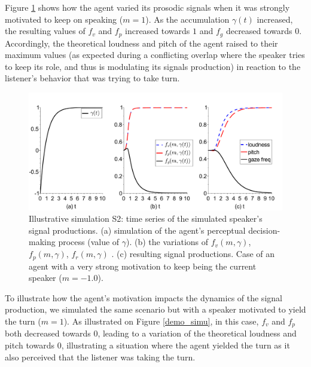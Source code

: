Figure \ref{demo_simu_l1} shows how the agent varied its prosodic signals when it was strongly motivated to keep on speaking ($m=1$).
As the accumulation $\gamma(t)$ increased, the resulting values of $f_v$ and $f_p$ increased towards $1$ and $f_g$ decreased towards $0$. 
Accordingly, the theoretical loudness and pitch of the agent raised to their maximum values (as expected during a conflicting overlap where the speaker tries to keep its role, and thus is modulating its signals production) in reaction to the listener's behavior that was trying to take turn. 


\begin{figure}
  \centering
  \includegraphics[width=\linewidth]{figure/signals_simu_s2a.pdf}
  \caption{Illustrative simulation S2: time series of the simulated speaker's signal productions. (a) simulation of the agent's perceptual decision-making process (value of $\gamma$). (b) the variations of $f_v(m,\gamma)$, $f_p(m,\gamma)$, $f_r(m,\gamma)$ . (c) resulting  signal productions. Case of an agent with a very strong motivation to keep being the current speaker ($m=-1.0$).}
  \label{demo_simu_l1}
\end{figure}

To illustrate how the agent's motivation impacts the dynamics of the signal production, we simulated the same scenario but with a speaker motivated to yield the turn ($m=1$). As illustrated on Figure \ref{demo_simu}, in this case, $f_v$ and $f_p$ both decreased towards $0$, leading to a variation of the theoretical loudness and pitch towards $0$, illustrating a situation where the agent yielded the turn as it also perceived that the listener was taking the turn. 

